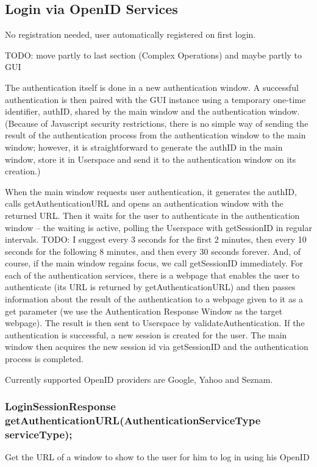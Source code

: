 \subsection{Login via OpenID Services}
\label{subsubsec:gui_openid}

No registration needed, user automatically registered on first login.

TODO: move partly to last section (Complex Operations) and maybe partly to GUI

The authentication itself is done in a new authentication window.
A successful authentication is then paired with the GUI instance using a temporary one-time identifier, authID, shared by the main window and the authentication window.
(Because of Javascript security restrictions, there is no simple way of sending the result of the authentication process from the authentication window to the main window;
however, it is straightforward to generate the authID in the main window, store it in Userspace and send it to the authentication window on its creation.)

When the main window requests user authentication, it generates the authID, calls getAuthenticationURL and opens an authentication window with the returned URL.
Then it waits for the user to authenticate in the authentication window
-- the waiting is active, polling the Userspace with getSessionID in regular intervals.
TODO: I suggest every 3 seconds for the first 2 minutes, then every 10 seconds for the following 8 minutes, and then every 30 seconds forever.
And, of course, if the main window regains focus, we call getSessionID immediately.
For each of the authentication services, there is a webpage that enables the user to authenticate
(its URL is returned by getAuthenticationURL)
and then passes information about the result of the authentication to a webpage given to it as a get parameter
(we use the Authentication Response Window as the target webpage).
The result is then sent to Userspace by validateAuthentication.
If the authentication is successful, a new session is created for the user.
The main window then acquires the new session id via getSessionID and the authentication process is completed.

Currently supported OpenID providers are Google, Yahoo and Seznam.

\subsubsection{LoginSessionResponse getAuthenticationURL(AuthenticationServiceType serviceType);}
Get the URL of a window to show to the user for him to log in using his OpenID


